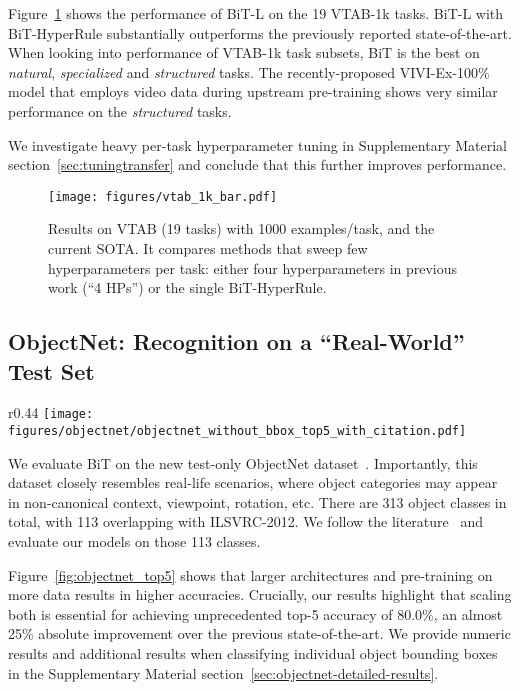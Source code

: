 \documentclass[runningheads]{llncs}
\newcommand{\name}{{BiT}}
\newcommand{\hyper}{{BiT-HyperRule}}
\newcommand{\imagenet}{{ILSVRC-2012}}
\begin{document}
Figure~\ref{fig:vtab_1k_bar} shows the performance of \name{}-L on the 19 VTAB-1k tasks.
\name{}-L with \hyper{} substantially outperforms the previously reported state-of-the-art.
When looking into performance of VTAB-1k task subsets, \name{} is the best on \emph{natural}, \emph{specialized} and \emph{structured} tasks.
The recently-proposed VIVI-Ex-100\%~\cite{vivi} model that employs video data during upstream pre-training shows very similar performance on the \emph{structured} tasks.

We investigate heavy per-task hyperparameter tuning in Supplementary Material section~\ref{sec:tuningtransfer} and conclude that this further improves performance.

\begin{figure}[t]
\centering
\texttt{[image: figures/vtab\_1k\_bar.pdf]}
\caption{Results on VTAB (19 tasks) with 1000 examples/task, and the current SOTA.
It compares methods that sweep few hyperparameters per task: either four hyperparameters in previous work (``4 HPs'') or the single \hyper{}.}\label{fig:vtab_1k_bar}\vspace{-1mm}
\end{figure}

\subsection{ObjectNet: Recognition on a ``Real-World'' Test Set}

\begin{wrapfigure}{r}{0.44\textwidth}
  \centering
  \vspace{-25pt}
  \texttt{[image: figures/objectnet/objectnet\_without\_bbox\_top5\_with\_citation.pdf]}\caption{Accuracy of BiT models along with baselines on ObjectNet. R is short for ResNet in x-axis.}
\vspace{-20pt}
\label{fig:objectnet_top5}
\end{wrapfigure}

We evaluate \name{} on the new test-only ObjectNet dataset~\cite{barbu2019objectnet}.
Importantly, this dataset closely resembles real-life scenarios, where object categories may appear in non-canonical context, viewpoint, rotation, etc.
There are 313 object classes in total, with 113 overlapping with \imagenet{}. 
We follow the literature~\cite{barbu2019objectnet,borji2020reobjectnet}
and evaluate our models on those 113 classes. 

Figure~\ref{fig:objectnet_top5} shows that larger architectures and pre-training on more data results in higher accuracies.
Crucially, our results highlight that scaling both is essential for achieving unprecedented  top-5 accuracy of 80.0\%, an almost 25\% absolute improvement over the previous state-of-the-art.
We provide numeric results and additional results when classifying individual object bounding boxes~\cite{borji2020reobjectnet} in the Supplementary Material section~\ref{sec:objectnet-detailed-results}.
\end{document}
